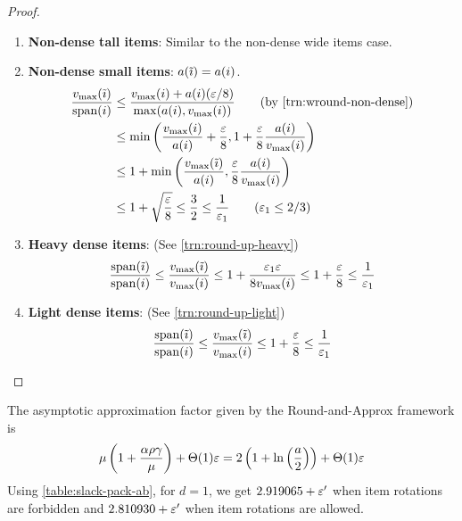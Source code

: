 \begin{proof}
\begin{enumerate}
\item \textbf{Non-dense tall items}: Similar to the non-dense wide items case.

\item \textbf{Non-dense small items}: $a(\tilde{\imath}) = a(i)$.
\begin{align*}
\frac{v_{\max}(\itild)}{\Span(i)}
&\le \frac{v_{\max}(i) + a(i)(\eps/8)}{\max(a(i), v_{\max}(i))}
\tag{by \cref{trn:wround-non-dense}}
\\ &\le \min\left(\frac{v_{\max}(i)}{a(i)} + \frac{\eps}{8},
    1 + \frac{\eps}{8} \frac{a(i)}{v_{\max}(i)} \right)
\\ &\le 1 + \min\left(\frac{v_{\max}(\itild)}{a(i)},
    \frac{\eps}{8} \frac{a(i)}{v_{\max}(i)} \right)
\\ &\le 1 + \sqrt{\frac{\eps}{8}} \le \frac{3}{2} \le \frac{1}{\epsLarge}
\tag{$\epsLarge \le 2/3$}
\end{align*}

\item \textbf{Heavy dense items}: (See \cref{trn:round-up-heavy})
\[ \frac{\operatorname{span}(\tilde{\imath})}{\operatorname{span}(i)} \le \frac{v_{\max}(\tilde{\imath})}{v_{\max}(i)}
\le 1 + \frac{\varepsilon_1\varepsilon}{8v_{\max}(i)} \le 1 + \frac{\varepsilon}{8} \le \frac{1}{\varepsilon_1} \]

\item \textbf{Light dense items}: (See \cref{trn:round-up-light})
\[ \frac{\operatorname{span}(\tilde{\imath})}{\operatorname{span}(i)} \le \frac{v_{\max}(\tilde{\imath})}{v_{\max}(i)}
\le 1 + \frac{\varepsilon}{8} \le \frac{1}{\varepsilon_1}  \qedhere \]
\end{enumerate}
\end{proof}

The asymptotic approximation factor given by the Round-and-Approx framework is
\[ \mu\left(1 + \frac{\alpha\rho\gamma}{\mu}\right) + \Theta(1)\varepsilon
= 2\left(1 + \ln\left(\frac{a}{2}\right)\right) + \Theta(1)\varepsilon \]
Using \cref{table:slack-pack-ab}, for $d=1$, we get $2.919065 + \varepsilon'$ when item rotations
are forbidden and $2.810930 + \varepsilon'$ when item rotations are allowed.

